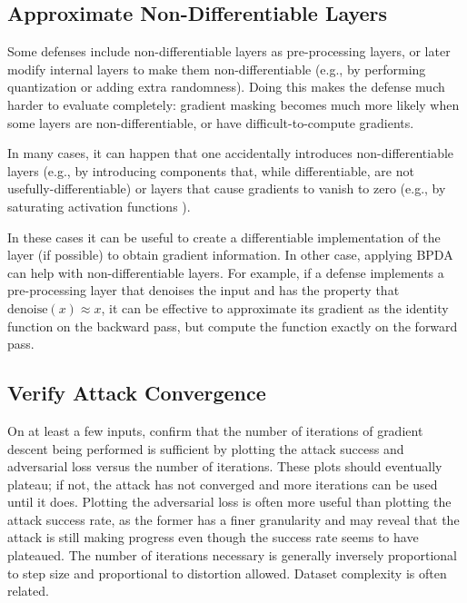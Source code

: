 \documentclass{article} %
\begin{document}
\subsection{Approximate Non-Differentiable Layers}
\label{sec:bpda}

Some defenses include non-differentiable layers as pre-processing
layers, or later modify internal layers to make them non-differentiable
(e.g., by performing quantization or adding extra randomness).
%
Doing this makes the defense much harder to evaluate completely:
gradient masking becomes much more likely when some layers are
non-differentiable, or have difficult-to-compute gradients.

In many cases, it can happen that one accidentally introduces non-differentiable
layers \citep{athalye2018obfuscated} (e.g., by introducing components
that, while differentiable, are not usefully-differentiable) or layers that
cause gradients to vanish to zero (e.g., by saturating
activation functions \citep{brendel2017comment,carlini2016defensive}).

In these cases it can be useful to create a
differentiable implementation of the layer (if possible) to
obtain gradient information.
%
In other case, applying BPDA \citep{athalye2018obfuscated} can help
with non-differentiable layers.
%
For example, if a defense implements a pre-processing layer that
denoises the input and has the property that $\text{denoise}(x) \approx x$,
it can be effective to approximate its gradient as the identity
function on the backward pass, but compute the function exactly
on the forward pass.


\subsection{Verify Attack Convergence}
\label{sec:converge}

On at least a few inputs, confirm
that the number of iterations of gradient descent being performed is
sufficient by plotting the attack success and adversarial loss versus the number of
iterations.
%
These plots should eventually plateau; if not, the attack
has not converged and more iterations can be used until
it does. Plotting the adversarial loss is often more useful than plotting the attack success rate, as the former has a finer granularity and may reveal that the attack is still making progress even though the success rate seems to have plateaued.
The number of
iterations necessary is generally inversely proportional to step size and
proportional to distortion allowed.
%
Dataset complexity is often related.
\end{document}
